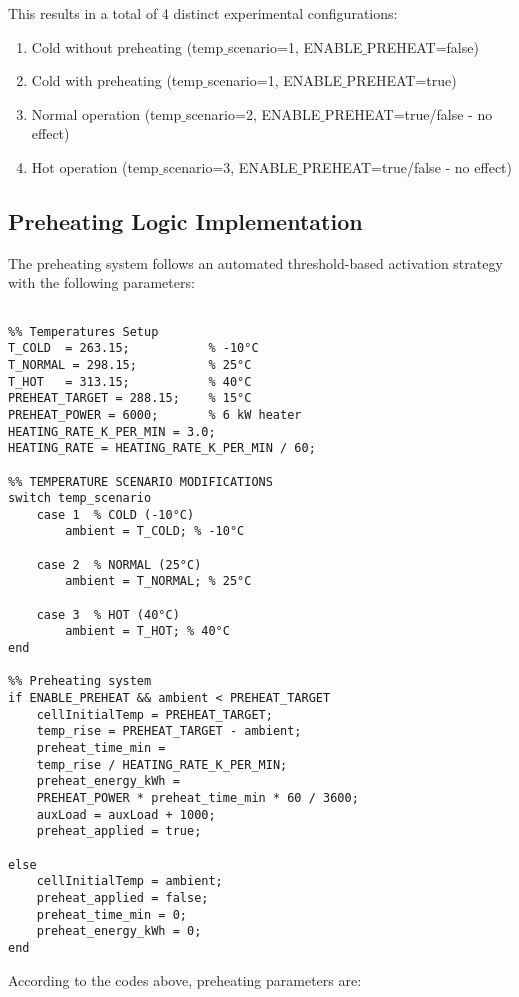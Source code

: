 \documentclass[conference]{IEEEtran}
\begin{document}
This results in a total of 4 distinct experimental configurations:
\begin{enumerate}
    \item Cold without preheating (temp$\_$scenario=1, ENABLE$\_$PREHEAT=false)
    \item Cold with preheating (temp$\_$scenario=1, ENABLE$\_$PREHEAT=true)
    \item Normal operation (temp$\_$scenario=2, ENABLE$\_$PREHEAT=true/false - no effect)
    \item Hot operation (temp$\_$scenario=3, ENABLE$\_$PREHEAT=true/false - no effect)
\end{enumerate}

\subsection{\textbf{Preheating Logic Implementation}}

The preheating system follows an automated threshold-based activation strategy with the following parameters:

\begin{verbatim}

%% Temperatures Setup
T_COLD  = 263.15;           % -10°C
T_NORMAL = 298.15;          % 25°C
T_HOT   = 313.15;           % 40°C
PREHEAT_TARGET = 288.15;    % 15°C
PREHEAT_POWER = 6000;       % 6 kW heater
HEATING_RATE_K_PER_MIN = 3.0;
HEATING_RATE = HEATING_RATE_K_PER_MIN / 60;

%% TEMPERATURE SCENARIO MODIFICATIONS
switch temp_scenario
    case 1  % COLD (-10°C)
        ambient = T_COLD; % -10°C
        
    case 2  % NORMAL (25°C)
        ambient = T_NORMAL; % 25°C
        
    case 3  % HOT (40°C)
        ambient = T_HOT; % 40°C
end

%% Preheating system
if ENABLE_PREHEAT && ambient < PREHEAT_TARGET
    cellInitialTemp = PREHEAT_TARGET;  
    temp_rise = PREHEAT_TARGET - ambient;
    preheat_time_min =
    temp_rise / HEATING_RATE_K_PER_MIN; 
    preheat_energy_kWh =
    PREHEAT_POWER * preheat_time_min * 60 / 3600;
    auxLoad = auxLoad + 1000;
    preheat_applied = true;
    
else
    cellInitialTemp = ambient;
    preheat_applied = false;
    preheat_time_min = 0;
    preheat_energy_kWh = 0;
end
\end{verbatim}

According to the codes above, preheating parameters are:
\end{document}
